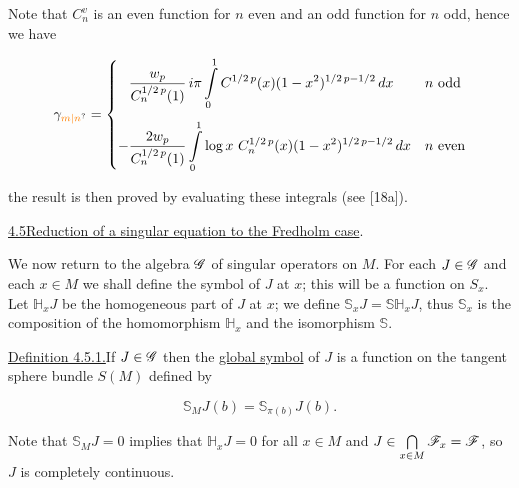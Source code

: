 Note that $C_n^v$ is an even function for $n$ even and an odd function for $n$ odd, hence we have

\[
\handwritten{\gamma_{\unsure{m|n}}}=\handwritten{\left\{}
\begin{aligned}
&\frac{w_p}{C_n^{1/2\,p}(1)}\,i\pi\handwritten{\int}\limits_0^1 C^{1/2\,p}(x)(1-x^2)^{1/2\,p-1/2}\,dx && n\text{ odd}\\[4pt]
-&\frac{2w_p}{C_n^{1/2\,p}(1)}\handwritten{\int}\limits_0^1\log x\ C_n^{1/2\,p}(x)(1-x^2)^{1/2\,p-1/2}\,dx && n\text{ even}
\end{aligned}\right.
\]

the result is then proved by evaluating these integrals (see [18a]).

\uline{4.5\quad Reduction of a singular equation to the Fredholm case}.

We now return to the algebra $\mathscr{G}$ of singular operators on $M$. For each $J\in\mathscr{G}$ and each $x\in M$ we shall define the symbol of $J$ at $x$; this will be a function on $S_x$. Let $\mathbb{H}_xJ$ be the homogeneous part of $J$ at $x$; we define $\mathbb{S}_xJ=\mathbb{S}\mathbb{H}_xJ$, thus $\mathbb{S}_x$ is the composition of the homomorphism $\mathbb{H}_x$ and the isomorphism $\mathbb{S}$.

\uline{Definition 4.5.1.}\qquad If $J\in\mathscr{G}$ then the \uline{global symbol} of $J$ is a function on the tangent sphere bundle $S(M)$ defined by

\[
\mathbb{S}_M J(b)=\mathbb{S}_{\pi(b)}J(b).
\]

Note that $\mathbb{S}_M J=0$ implies that $\mathbb{H}_x J=0$ for all $x\in M$ and $J\in\bigcap\limits_{x\in M}\mathscr{F}_x=\mathscr{F}$, so $J$ is completely continuous.

